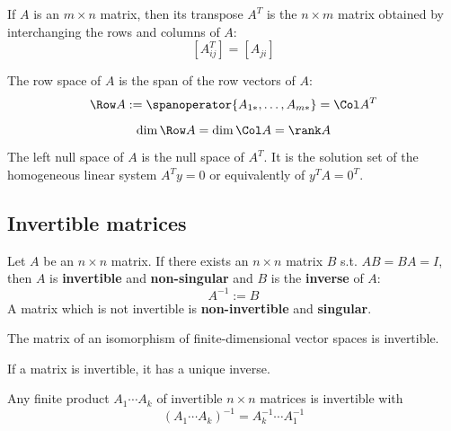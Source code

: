 \begin{definition}
  If $A$ is an $m \times n$ matrix, then its transpose $A^T$ is the $n \times m$ matrix obtained by interchanging the rows and columns of $A$:
  \[
    \left[A^T_{ij}\right] = \left[A_{ji}\right]
  \]
\end{definition}

\begin{definition}
  The row space of $A$ is the span of the row vectors of $A$:
  \[
    \Row A := \spanoperator \{ A_{1*}, \ldots, A_{m*} \} = \Col A^T
  \]
\end{definition}

\begin{lemma}
  \[
    \dim \Row A = \dim \Col A = \rank A
  \]
\end{lemma}

\begin{definition}
  The left null space of $A$ is the null space of $A^T$. It is the solution set of the homogeneous linear system $A^T y = 0$ or equivalently of $y^T A = 0^T$.
\end{definition}

\subsection{Invertible matrices}

\begin{definition}
  Let $A$ be an $n \times n$ matrix. If there exists an $n \times n$ matrix $B$ s.t. $AB = BA = I$, then $A$ is \textbf{invertible} and \textbf{non-singular} and $B$ is the \textbf{inverse} of $A$:
  \[
    A^{-1} := B
  \]
  A matrix which is not invertible is \textbf{non-invertible} and \textbf{singular}.
\end{definition}

\begin{lemma}
  The matrix of an isomorphism of finite-dimensional vector spaces is invertible.
\end{lemma}

\begin{lemma}
  If a matrix is invertible, it has a unique inverse.
\end{lemma}

\begin{lemma}
  Any finite product $A_1 \cdots A_k$ of invertible $n \times n$ matrices is invertible with
  \[
    (A_1 \cdots A_k)^{-1} = A_k^{-1} \cdots A_1^{-1}
  \]
\end{lemma}

